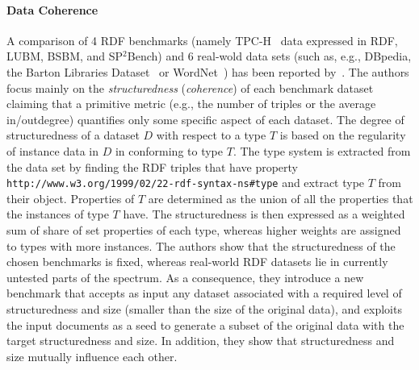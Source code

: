 \paragraph{Data Coherence}  A comparison of 4 RDF benchmarks (namely TPC-H~\cite{TPC-H} data expressed in RDF, LUBM, BSBM, and SP$^2$Bench) and 6 real-wold data sets (such as, e.g.,  DBpedia, the Barton Libraries Dataset~\cite{barton-benchmark} or
WordNet~\cite{Miller:1995:WLD:219717.219748}) has been reported by~\cite{Duan:2011:AOC:1989323.1989340}. The authors focus mainly on the  \emph{structuredness} (\emph{coherence}) of each benchmark dataset claiming that a primitive metric (e.g., the number of triples or the average in/outdegree) quantifies only some specific aspect of each dataset. The degree of structuredness of a dataset $D$ with respect to a type $T$ is based on  the regularity of instance data in $D$ in conforming to type $T$. The type system is extracted from the data set by finding the RDF triples that have property  \texttt{http://www.w3.org/1999/02/22-rdf-syntax-ns\#type} and extract type $T$ from their object. Properties of $T$ are determined as the union of all the properties that the instances of type $T$ have. The structuredness is then expressed as a weighted sum of share of set properties of each type, whereas higher weights are assigned to types with more instances. The authors show that the structuredness of the chosen benchmarks is fixed, whereas real-world RDF datasets lie in currently untested parts of the spectrum. As a consequence, they introduce a new benchmark that accepts as input any dataset associated with a required level of structuredness and size (smaller than the size of the original data), and exploits the input documents as a seed to generate a subset of the original data with the target structuredness and size. In addition, they show that structuredness and size mutually influence each other.


